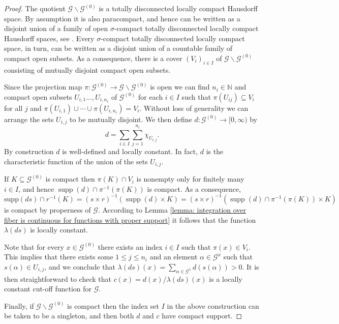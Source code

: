 \documentclass{amsart}
\newcommand{\G}{\mathcal{G}}
\begin{document}
\begin{proof}
The quotient $ \G \backslash \G^{(0)} $ is a totally disconnected locally compact Hausdorff space. By assumption it is also paracompact, and hence can be written as a disjoint union of a family of open $ \sigma $-compact totally disconnected locally compact Hausdorff spaces, see \cite[Section 9.10]{BOURBAKI_generaltopology1}. 
Every $ \sigma $-compact totally disconnected locally compact space, in turn, can be written as a disjoint union of a countable family of compact open subsets. 
As a consequence, there is a cover $ (V_i)_{i \in I} $ of $ \G \backslash \G^{(0)} $ consisting of mutually disjoint compact open subsets. 

Since the projection map $ \pi: \G^{(0)} \rightarrow \G \backslash \G^{(0)} $ is open we can find $ n_i \in \mathbb{N} $ and compact open subsets $ U_{i,1} \dots, U_{i, n_i} $ 
of $ \G^{(0)} $ for each $ i \in I $ such that $ \pi(U_{ij}) \subseteq V_i $ for all $ j $ and $ \pi(U_{i,1}) \cup \cdots \cup \pi(U_{i, n_i}) = V_i $. 
Without loss of generality we can arrange the sets $ U_{i,j} $ to be mutually disjoint. 
We then define $ d: \G^{(0)} \rightarrow [0, \infty) $ by 
$$ 
d = \sum_{i \in I} \sum_{j = 1}^{n_i} \chi_{U_{i,j}}.
$$
By construction $ d $ is well-defined and locally constant. In fact, $ d $ is the characteristic function of the union of the sets $ U_{i,j} $. 

If $ K \subseteq \G^{(0)} $ is compact then $ \pi(K) \cap V_i $ is nonempty only for finitely many $ i \in I $, and hence 
$ \operatorname{supp}(d) \cap \pi^{-1}(\pi(K)) $ is compact. As a consequence, 
$$ 
\mathrm{supp}(d s) \cap r^{-1}(K) = (s\times r)^{-1}(\operatorname{supp}(d) \times K) = (s\times r)^{-1}(\operatorname{supp}(d) \cap \pi^{-1}(\pi(K)) \times K) 
$$ 
is compact by properness of $ \G $. According to Lemma \ref{lemma: integration over fiber is continuous for functions with proper support} it follows that the function $ \lambda(ds) $ is locally constant. 

Note that for every $ x \in \G^{(0)} $ there exists an index $ i \in I $ such that $ \pi(x) \in V_i $. This implies that there exists some $ 1 \leq j \leq n_i $ 
and an element $ \alpha \in \G^x $ such that $ s(\alpha) \in U_{i,j} $, 
and we conclude that $ \lambda(ds)(x) = \sum_{\alpha\in \G^x} d(s(\alpha)) > 0 $.
It is then straightforward to check that $ c(x) = d(x)/\lambda(ds)(x) $ is a locally constant cut-off function for $ \G $.

Finally, if $ \G \backslash \G^{(0)} $ is compact then the index set $ I $ in the above construction can be taken to be a singleton, and then both $ d $ and $ c $ have compact support. 
\end{proof}
\end{document}
